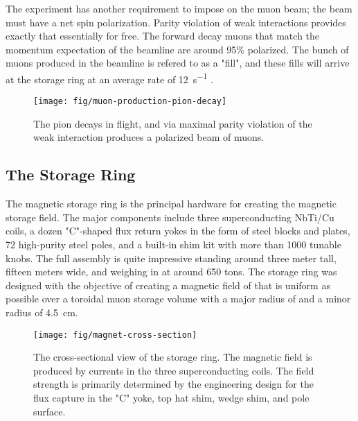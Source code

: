 The experiment has another requirement to impose on the muon beam; the beam must have a net spin polarization.  Parity violation of weak interactions provides exactly that essentially for free.  The forward decay muons that match the momentum expectation of the beamline are around 95\% polarized.  The bunch of muons produced in the beamline is refered to as a "fill", and these fills will arrive at the storage ring at an average rate of \SI{12}{\second^{-1}} \cite{e989-tdr}.

\begin{figure}
\label{fig:muon-production-pion-decay}
\texttt{[image: fig/muon-production-pion-decay]}
\caption{The pion decays in flight, and via maximal parity violation of the weak interaction produces a polarized beam of muons. }
\end{figure}

\subsection{The Storage Ring} \label{sec:storage-ring}

The magnetic storage ring is the principal hardware for creating the magnetic storage field.  The major components include three superconducting NbTi/Cu coils, a dozen "C"-shaped flux return yokes in the form of steel blocks and plates, 72 high-purity steel poles, and a built-in shim kit with more than 1000 tunable knobs.  The full assembly is quite impressive standing around three meter tall, fifteen meters wide, and weighing in at around 650  tons.  The storage ring was designed with the objective of creating a magnetic field of \bmagic that is uniform as possible over a toroidal muon storage volume with a major radius of \rmagic and a minor radius of \SI{4.5}{\cm}.

\begin{figure}
\texttt{[image: fig/magnet-cross-section]}
\caption{The cross-sectional view of the storage ring.  The magnetic field is produced by currents in the three superconducting coils.  The field strength is primarily determined by the engineering design for the flux capture in the "C" yoke, top hat shim, wedge shim, and pole surface.}
\label{fig:magnet-cross-section}
\end{figure}

